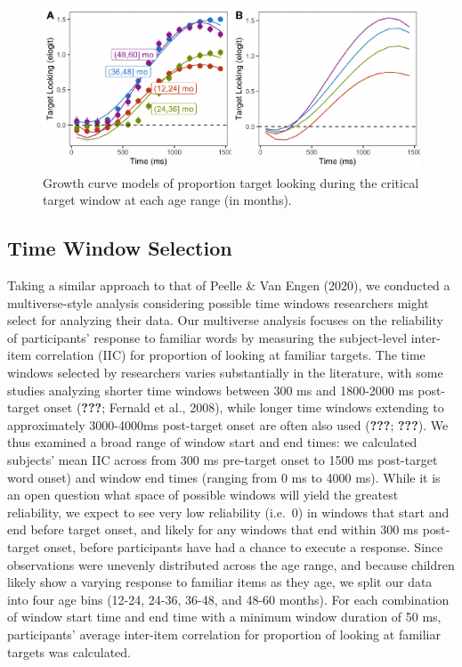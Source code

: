 \documentclass[10pt, letterpaper]{article}
\newenvironment{CodeChunk}{}{}
\begin{document}
\begin{CodeChunk}
\begin{figure}[h]

{\centering \includegraphics{figs/age_gca-1} 

}

\caption[Growth curve models of proportion target looking during the critical target window at each age range (in months)]{Growth curve models of proportion target looking during the critical target window at each age range (in months).}\label{fig:age_gca}
\end{figure}
\end{CodeChunk}

\hypertarget{time-window-selection}{%
\subsection{Time Window Selection}\label{time-window-selection}}

Taking a similar approach to that of Peelle \& Van Engen (2020), we
conducted a multiverse-style analysis considering possible time windows
researchers might select for analyzing their data. Our multiverse
analysis focuses on the reliability of participants' response to
familiar words by measuring the subject-level inter-item correlation
(IIC) for proportion of looking at familiar targets. The time windows
selected by researchers varies substantially in the literature, with
some studies analyzing shorter time windows between 300 ms and 1800-2000
ms post-target onset ({\textbf{???}}; Fernald et al., 2008), while
longer time windows extending to approximately 3000-4000ms post-target
onset are often also used ({\textbf{???}}; {\textbf{???}}). We thus
examined a broad range of window start and end times: we calculated
subjects' mean IIC across from 300 ms pre-target onset to 1500 ms
post-target word onset) and window end times (ranging from 0 ms to 4000
ms). While it is an open question what space of possible windows will
yield the greatest reliability, we expect to see very low reliability
(i.e.~0) in windows that start and end before target onset, and likely
for any windows that end within 300 ms post-target onset, before
participants have had a chance to execute a response. Since observations
were unevenly distributed across the age range, and because children
likely show a varying response to familiar items as they age, we split
our data into four age bins (12-24, 24-36, 36-48, and 48-60 months). For
each combination of window start time and end time with a minimum window
duration of 50 ms, participants' average inter-item correlation for
proportion of looking at familiar targets was calculated.
\end{document}
